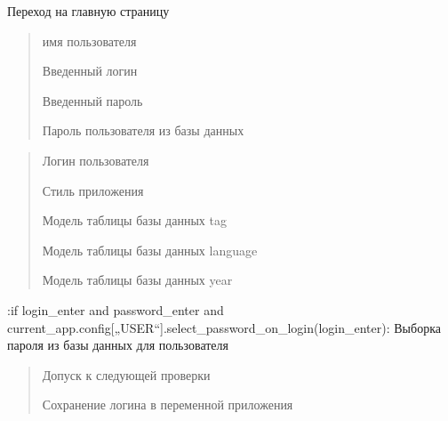 \documentclass[letterpaper,10pt,russian]{sphinxmanual}
\begin{document}
\begin{fulllineitems}
\label{\detokenize{blueprints:blueprints.auth.main}}
\pysigstartsignatures
{}
\pysigstopsignatures
\sphinxAtStartPar
Переход на главную страницу
\begin{description}
\begin{quote}\begin{description}
\sphinxAtStartPar
имя пользователя

\sphinxAtStartPar
Введенный логин

\sphinxAtStartPar
Введенный пароль

\sphinxAtStartPar
Пароль пользователя из базы данных

\end{description}\end{quote}

\begin{quote}\begin{description}
\sphinxAtStartPar
Логин пользователя

\sphinxAtStartPar
Стиль приложения

\sphinxAtStartPar
Модель таблицы базы данных tag

\sphinxAtStartPar
Модель таблицы базы данных language

\sphinxAtStartPar
Модель таблицы базы данных year

\end{description}\end{quote}

\sphinxAtStartPar
:if login\_enter and password\_enter and
current\_app.config{[}„USER“{]}.select\_password\_on\_login(login\_enter): Выборка пароля из базы данных для пользователя
\begin{quote}\begin{description}
\sphinxAtStartPar
Допуск к следующей проверки

\sphinxAtStartPar
Сохранение логина в переменной приложения


\end{description}
\end{quote}
\end{description}
\end{fulllineitems}
\end{document}
